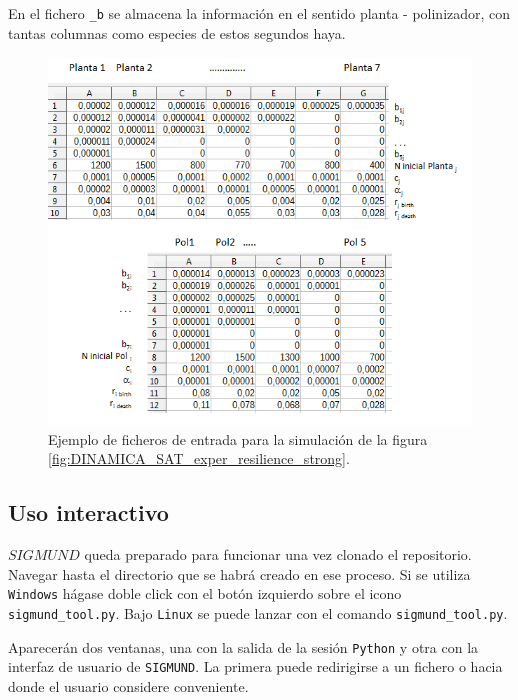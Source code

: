 En el fichero \texttt{\_b} se almacena la información en el sentido planta - polinizador, con tantas columnas como especies de estos segundos haya.

\begin{figure}[h!]
\centering
\includegraphics[scale=1]{ManFigs/matricessim.png}
\caption{Ejemplo de ficheros de entrada para la simulación de la figura \ref{fig:DINAMICA_SAT_exper_resilience_strong}.}
\label{fig:ASIGMUNDMAN_matricessim}
\end{figure}

\clearpage
\subsection*{Uso interactivo}
\label{sec:ASIGMUNDMAN_ui}

$SIGMUND$ queda preparado para funcionar una vez clonado el repositorio. Navegar hasta el directorio  que se habrá creado en ese proceso. Si se utiliza \texttt{Windows} hágase doble click con el botón izquierdo sobre el icono \texttt{sigmund\_tool.py}. Bajo \texttt{Linux} se puede lanzar con el comando \texttt{sigmund\_tool.py}.

Aparecerán dos ventanas, una con la salida de la sesión \texttt{Python} y otra con la interfaz de usuario de \texttt{SIGMUND}. La primera puede redirigirse a un fichero o hacia donde el usuario considere conveniente.



